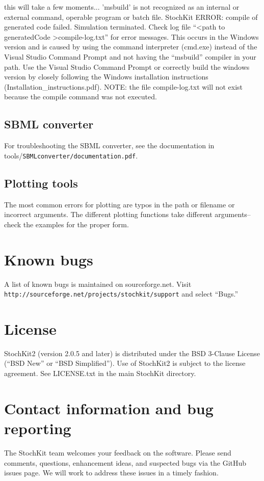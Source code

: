 \documentclass[11pt,letterpaper]{article}
\begin{document}
\begin{itemize}
{    this will take a few moments...
'msbuild' is not recognized as an internal or external command, operable program or batch file.
StochKit ERROR: compile of generated code failed. Simulation terminated.
Check log file ``<path to generatedCode >compile-log.txt'' for error messages.}
This occurs in the Windows version and is caused by using the command interpreter (cmd.exe) instead of the Visual Studio Command Prompt and not having the ``msbuild'' compiler in your path.  Use the Visual Studio Command Prompt or correctly build the windows version by closely following the Windows installation instructions (Installation\_instructions.pdf).  NOTE: the file compile-log.txt will not exist because the compile command was not executed. 
\end{itemize}

\subsection{SBML converter}
For troubleshooting the SBML converter, see the documentation in  tools/\texttt{SBMLconverter/documentation.pdf}.

\subsection{Plotting tools}
The most common errors for plotting are typos in the path or filename or incorrect arguments.  The different plotting functions take different arguments--check the examples for the proper form.

\section{Known bugs}
A list of known bugs is maintained on sourceforge.net.  Visit \texttt{http://sourceforge.net/projects/stochkit/support} and select ``Bugs.''

\section{License}
StochKit2 (version 2.0.5 and later) is distributed under the BSD 3-Clause License (``BSD New'' or ``BSD Simplified''). Use of StochKit2 is subject to the license agreement.  See LICENSE.txt in the main StochKit directory.

\section{Contact information and bug reporting}
The StochKit team welcomes your feedback on the software.  Please send comments, questions, enhancement ideas, and suspected bugs via the GitHub issues page. We will work to address these issues in a timely fashion.
\end{document}
